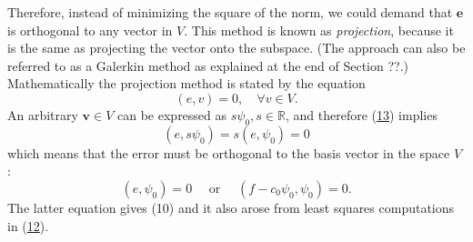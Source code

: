 \documentclass[../main.tex]{subfiles}
\begin{document}
	Therefore, instead of minimizing the square of the norm, we could demand that $\boldsymbol{e}$ is orthogonal to any vector in $V$. This method is known as \textit{projection}, because it is the same as projecting the vector onto the subspace. (The approach can also be referred to as a Galerkin method as explained at the end of Section ??.)
	Mathematically the projection method is stated by the equation
	\begin{equation}\label{eqa13}
		(e, v)=0, \quad \forall v \in V.
	\end{equation}
	An arbitrary $\boldsymbol{v} \in V$ can be expressed as $s \psi_{0}, s \in \mathbb{R}$, and therefore (\hyperref[eqa13]{13}) implies
	$$
	\left(e, s \psi_{0}\right)=s\left(e, \psi_{0}\right)=0
	$$
	which means that the error must be orthogonal to the basis vector in the space $V$ :
	$$
	\left(e, \psi_{0}\right)=0 \quad \text { or } \quad\left(f-c_{0} \psi_{0}, \psi_{0}\right)=0.
	$$
	The latter equation gives (10) and it also arose from least squares computations in (\hyperref[eqa12]{12}).
	
\end{document}
